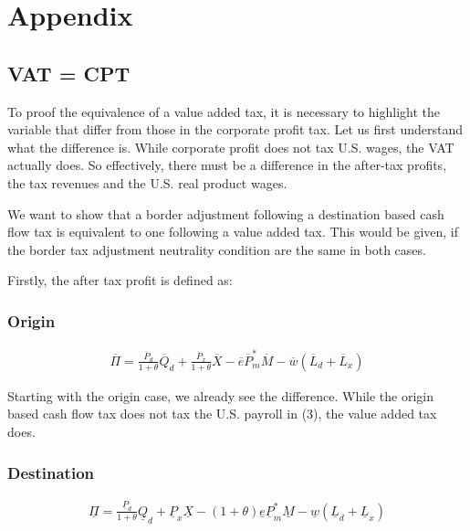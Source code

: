 \section{Appendix}

\subsection{VAT = CPT}
To proof the equivalence of a value added tax, it is necessary to highlight the variable that differ from those in the corporate profit tax. Let us first understand what the difference is. While corporate profit does not tax U.S. wages, the VAT actually does. So effectively, there must be a difference in the after-tax profits, the tax revenues and the U.S. real product wages. 

We want to show that a border adjustment following a destination based cash flow tax is equivalent to one following a value added tax. This would be given, if the border tax adjustment neutrality condition are the same in both cases. 

Firstly, the after tax profit is defined as: 

\subsubsection*{Origin}
\begin{equation}
\begin{aligned}
\overline \Pi = \frac{\overline P_d}{1+\theta}\overline Q_d + \frac{\overline P_x}{1+\theta}\overline X - \overline e \overline P^*_m \overline M - \overline w  \left( \overline L_d + \overline L_x \right)  
\end{aligned}
\end{equation}

Starting with the origin case, we already see the difference.  While the origin based cash flow tax does not tax the U.S. payroll in (3), the value added tax does.

\subsubsection*{Destination}
\begin{equation}
\begin{aligned}
\underline \Pi = \frac{\underline P_d}{1+\theta}\underline Q_d +\underline P_x\underline X -  \left( 1+\theta \right) \underline e \underline P^*_m \underline M - \underline w  \left( \underline L_d + \underline L_x \right) 
\end{aligned}
\end{equation}


